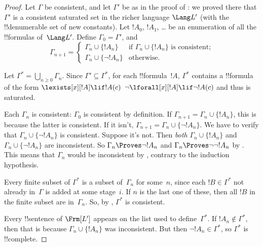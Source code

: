 \documentclass[../../../include/open-logic-section]{subfiles}
\begin{document}
\begin{proof}
Let $\Gamma$ be consistent, and let $\Gamma'$ be as in the proof of
: we proved there that $\Gamma'$
is a consistent saturated set in the richer language $\Lang L'$ (with
the !!{denumerable} set of new constants).  Let $!A_0$, $!A_1$, \dots{}
be an enumeration of all the !!{formula}s of~$\Lang L'$.  Define
$\Gamma_0 = \Gamma'$, and
\[
\Gamma_{n+1} =
\begin{cases}
\Gamma_n \cup \{ !A_n \} & \textrm{if $\Gamma_n \cup \{!A_n\}$ is
  consistent;} \\
\Gamma_n \cup \{ \lnot !A_n \} & \textrm{otherwise.}
\end{cases}
\]

Let $\Gamma^* = \bigcup_{n \geq 0} \Gamma_n$. Since $\Gamma' \subseteq
\Gamma^*$, for each !!{formula}~$!A$, $\Gamma^*$ contains a
!!{formula} of the form
{$\lexists[x][!A] \lif !A(c)$}
{$\lnot\lforall[x][!A] \lif \lnot !A(c)$}
and thus is saturated.

Each $\Gamma_n$ is consistent: $\Gamma_0$ is consistent by definition.
If $\Gamma_{n+1} = \Gamma_n \cup \{!A_n\}$, this is because the latter
is consistent.  If it isn't, $\Gamma_{n+1} = \Gamma_n \cup \{\lnot
!A_n\}$. We have to verify that $\Gamma_n \cup \{\lnot !A_n\}$ is
consistent. Suppose it's not. Then \emph{both} $\Gamma_n \cup
\{!A_n\}$ and $\Gamma_n \cup \{\lnot !A_n\}$ are inconsistent. So
$\Gamma_n \Proves \lnot !A_n$ and $\Gamma_n \Proves \lnot\lnot !A_n$
by
. This
means that $\Gamma_n$ would be inconsistent by
,
contrary to the induction hypothesis.

Every finite subset of $\Gamma^*$ is a subset of~$\Gamma_n$ for
some~$n$, since each $!B \in \Gamma^*$ not already in~$\Gamma$ is
added at some stage~$i$. If $n$ is the last one of these, then all
$!B$ in the finite subset are in~$\Gamma_n$. So, by
,
$\Gamma^*$ is consistent.

Every !!{sentence} of $\Frm[L']$ appears on the list used to
define~$\Gamma^*$. If $!A_n \notin \Gamma^*$, then that is because
$\Gamma_n \cup \{!A_n\}$ was inconsistent.  But then $\lnot !A_n
\in \Gamma^*$, so $\Gamma^*$ is !!{complete}.
\end{proof}
\end{document}
